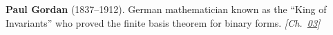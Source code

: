 \textbf{Paul Gordan} (1837–1912). German mathematician known as the ``King of Invariants'' who proved the finite basis theorem for binary forms. \emph{[Ch.~\hyperref[ch:banach]{03}]}

